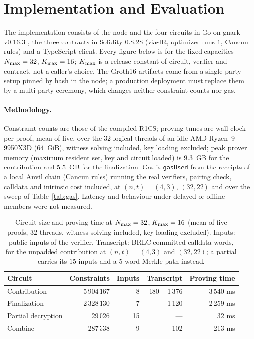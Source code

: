 \section{Implementation and Evaluation}
\label{sec:impl}

The implementation consists of the node and the four circuits in Go on gnark v0.16.3 \cite{gnark}, the three contracts in Solidity 0.8.28 (via-IR, optimizer runs $1$, Cancun rules) and a TypeScript client. Every figure below is for the fixed capacities $N_{\max} = 32$, $K_{\max} = 16$; $K_{\max}$ is a release constant of circuit, verifier and contract, not a caller's choice. The Groth16 artifacts come from a single-party setup pinned by hash in the node; a production deployment must replace them by a multi-party ceremony, which changes neither constraint counts nor gas.

\paragraph{Methodology.} Constraint counts are those of the compiled R1CS; proving times are wall-clock per proof, mean of five, over the $32$ logical threads of an idle AMD Ryzen~9 9950X3D ($64$~GiB), witness solving included, key loading excluded; peak prover memory (maximum resident set, key and circuit loaded) is $9.3$~GB for the contribution and $5.5$~GB for the finalization. Gas is \texttt{gasUsed} from the receipts of a local Anvil chain (Cancun rules) running the real verifiers, pairing check, calldata and intrinsic cost included, at $(n, t) = (4, 3)$, $(32, 22)$ and over the sweep of Table~\ref{tab:gas}. Latency and behaviour under delayed or offline members were not measured.

\begin{table}[t]
\centering
\caption{Circuit size and proving time at $N_{\max} = 32$, $K_{\max} = 16$ (mean of five proofs, $32$ threads, witness solving included, key loading excluded). Inputs: public inputs of the verifier. Transcript: BRLC-committed calldata words, for the unpadded contribution at $(n, t) = (4, 3)$ and $(32, 22)$; a partial carries its $15$ inputs and a $5$-word Merkle path instead.}
\label{tab:results}
\small
\renewcommand{\arraystretch}{1.1}
\begin{tabular}{lrrrr}
\hline
Circuit & Constraints & Inputs & Transcript & Proving time \\
\hline
Contribution & 5\,904\,167 & 8 & 180 -- 1\,376 & 3\,540 ms \\
Finalization & 2\,328\,130 & 7 & 1\,120 & 2\,259 ms \\
Partial decryption & 29\,026 & 15 & --- & 32 ms \\
Combine & 287\,338 & 9 & 102 & 213 ms \\
\hline
\end{tabular}
\end{table}

